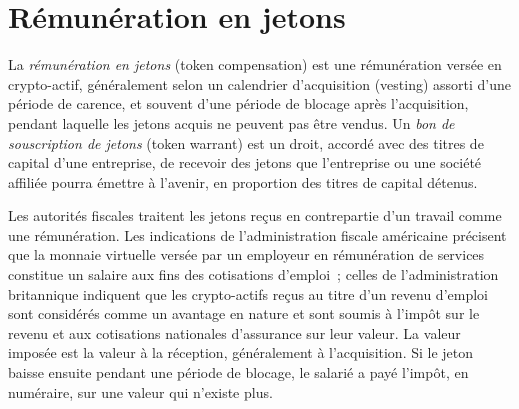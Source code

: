 \begin{omfigure}

\label{fig:in:crypto-native-firms:perhead}
\end{omfigure}

\section{Rémunération en jetons}

\begin{definition}\label{def:in:crypto-native-firms:tokens}
La \emph{rémunération en jetons} (token compensation) est une rémunération versée en crypto-actif, généralement selon un calendrier d'acquisition (vesting)
assorti d'une période de carence, et souvent d'une période de blocage après l'acquisition, pendant laquelle les jetons acquis ne peuvent pas être vendus. Un \emph{bon de souscription
de jetons} (token warrant) est un droit, accordé avec des titres de capital d'une entreprise, de recevoir des jetons que l'entreprise ou une
société affiliée pourra émettre à l'avenir, en proportion des titres de capital détenus.
\end{definition}

Les autorités fiscales traitent les jetons reçus en contrepartie d'un travail comme une rémunération. Les indications de l'administration fiscale américaine précisent que la monnaie virtuelle versée
par un employeur en rémunération de services constitue un salaire aux fins des cotisations d'emploi~; celles de l'administration britannique indiquent que les crypto-actifs reçus au titre d'un revenu d'emploi
sont considérés comme un avantage en nature et sont soumis à l'impôt sur le revenu et aux cotisations nationales d'assurance sur
leur valeur. La valeur imposée est la valeur à la réception, généralement à l'acquisition. Si le jeton baisse ensuite pendant une période de blocage, le
salarié a payé l'impôt, en numéraire, sur une valeur qui n'existe plus.

